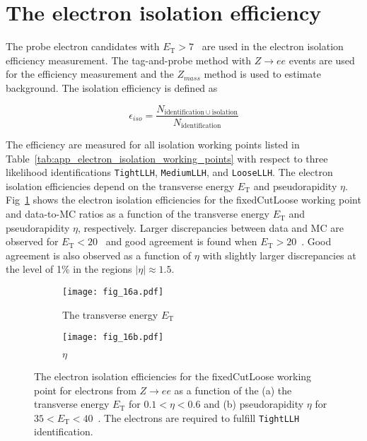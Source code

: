 
\section{The electron isolation efficiency}
\label{sec:app_electron_isolation_efficiency}
The probe electron candidates with $E_\mathrm{T} > 7$~{\GeV} are used in the electron isolation efficiency measurement.
The tag-and-probe method with $Z \to ee$ events are used for the efficiency measurement and the $Z_{mass}$ method is used to estimate background.
The isolation efficiency is defined as

\begin{equation}
    \epsilon_{iso} = \frac{N_{\mathrm{identification} \cup \mathrm{isolation}}}{N_\mathrm{identification}}
\end{equation}

The efficiency are measured for all isolation working points listed in Table~\ref{tab:app_electron_isolation_working_points} with respect to three likelihood identifications \texttt{TightLLH}, \texttt{MediumLLH}, and \texttt{LooseLLH}.
The electron isolation efficiencies depend on the transverse energy $E_\mathrm{T}$ and pseudorapidity $\eta$.
Fig~\ref{fig:app_electron_isolation_isolation_plots} shows the electron isolation efficiencies for the fixedCutLoose working point and data-to-MC ratios as a function of the transverse energy $E_\mathrm{T}$ and pseudorapidity $\eta$, respectively.
Larger discrepancies between data and MC are observed for $E_\mathrm{T} < 20$~{\GeV} and good agreement is found when $E_\mathrm{T} > 20$~{\GeV}.
Good agreement is also observed as a function of $\eta$ with slightly larger discrepancies at the level of 1\% in the regions $|\eta| \approx 1.5$.

\begin{figure}[htbp]
    \begin{subfigure}[b]{0.48\textwidth}
        \begin{center}
            \texttt{[image: fig\_16a.pdf]}
            \caption{The transverse energy $E_\mathrm{T}$}
        \end{center}
    \end{subfigure}
    \begin{subfigure}[b]{0.48\textwidth}
        \begin{center}
            \texttt{[image: fig\_16b.pdf]}
            \caption{$\eta$}
        \end{center}
    \end{subfigure}
    \caption{The electron isolation efficiencies for the fixedCutLoose working point for electrons from $Z \to ee$ as a function of the (a) the transverse energy $E_\mathrm{T}$ for $0.1 < \eta < 0.6$ and (b) pseudorapidity $\eta$ for $35 < E_\mathrm{T} < 40$~{\GeV}.
    The electrons are required to fulfill \texttt{TightLLH} identification.}
    \label{fig:app_electron_isolation_isolation_plots}
\end{figure}

